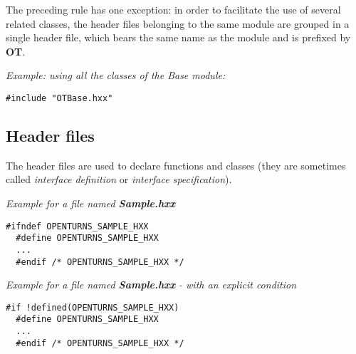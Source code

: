 The preceding rule has one exception: in order to facilitate the use of several related classes, the header files belonging to the same module are grouped in a single header file, which bears the same name as the module and is prefixed by {\bf OT}.

\emph{Example: using all the classes of the Base module:}
\begin{lstlisting}[frame=TBRL]
  #include "OTBase.hxx"
\end{lstlisting}

\subsection{Header files}
The header files are used to declare functions and classes (they are sometimes called \emph{interface definition} or \emph{interface specification}).



\emph{Example for a file named {\bf Sample.hxx}}
\lstset{language=C++, basicstyle=\normalsize}
\begin{lstlisting}[frame=TBRL]
  #ifndef OPENTURNS_SAMPLE_HXX
  #define OPENTURNS_SAMPLE_HXX
  ...
  #endif /* OPENTURNS_SAMPLE_HXX */
\end{lstlisting}

\emph{Example for a file named {\bf Sample.hxx} - with an explicit condition}
\lstset{language=C++, basicstyle=\normalsize}
\begin{lstlisting}[frame=TBRL]
  #if !defined(OPENTURNS_SAMPLE_HXX)
  #define OPENTURNS_SAMPLE_HXX
  ...
  #endif /* OPENTURNS_SAMPLE_HXX */
\end{lstlisting}



